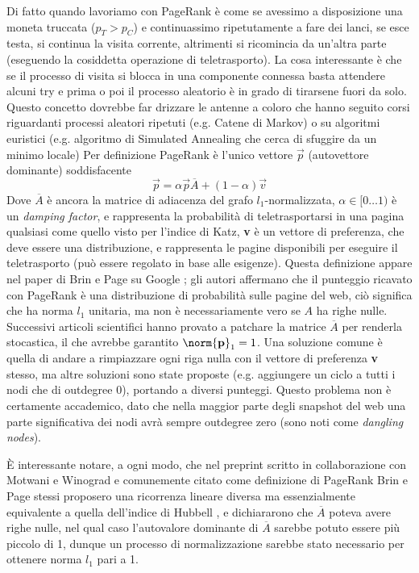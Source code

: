 Di fatto quando lavoriamo con PageRank è come se avessimo a disposizione una moneta truccata ($p_T >
	p_C$) e continuassimo ripetutamente a fare dei lanci, se esce testa, si continua la visita corrente,
altrimenti si ricomincia da un'altra parte (eseguendo la cosiddetta operazione di teletrasporto). La cosa interessante è che se il processo di visita si blocca in una componente connessa basta attendere alcuni try e prima o poi il processo aleatorio è in grado di tirarsene fuori da solo. Questo concetto dovrebbe far drizzare le antenne a coloro che hanno seguito corsi riguardanti processi aleatori ripetuti (e.g. Catene di Markov) o su algoritmi euristici (e.g. algoritmo di Simulated Annealing che cerca di sfuggire da un minimo locale)
Per definizione PageRank è l'unico vettore $\vec{p}$ (autovettore dominante) soddisfacente
\begin{equation}
	\label{eq:pagerank}
	\vec{p} = \alpha\vec{p}\overline{A} + (1 - \alpha)\vec{v}
\end{equation}
Dove $\overline{A}$ è ancora la matrice di adiacenza del grafo $l_1$-normalizzata, $\alpha \in [0\dots1)$ è un \textit{damping factor}, e rappresenta la probabilità di teletrasportarsi in una pagina qualsiasi come quello visto per l'indice di Katz, \textbf{v} è un vettore di preferenza, che deve essere una distribuzione, e rappresenta le pagine disponibili per eseguire il teletrasporto (può essere regolato in base alle esigenze). Questa definizione appare nel paper di Brin e Page su Google \cite{google}; gli autori affermano che il punteggio ricavato con PageRank è una distribuzione di probabilità sulle pagine del web, ciò significa che ha norma $l_1$ unitaria, ma non è necessariamente vero se $A$ ha righe nulle. Successivi articoli scientifici hanno provato a patchare la matrice $\overline{A}$ per renderla stocastica, il che avrebbe garantito $\norm{\textbf{p}}_1 = 1$. Una soluzione comune è quella di andare a rimpiazzare ogni riga nulla con il vettore di preferenza \textbf{v} stesso, ma altre soluzioni sono state proposte (e.g. aggiungere un ciclo a tutti i nodi che di outdegree 0), portando a diversi punteggi. Questo problema non è certamente accademico, dato che nella maggior parte degli snapshot del web una parte significativa dei nodi avrà sempre outdegree zero (sono noti come \textit{dangling nodes}).

È interessante notare, a ogni modo, che nel preprint scritto in collaborazione con Motwani e Winograd e comunemente citato come definizione di PageRank \cite{prankpreprint} Brin e Page stessi proposero una ricorrenza lineare diversa ma essenzialmente equivalente a quella dell'indice di Hubbell \cite{hub}, e dichiararono che $\overline{A}$ poteva avere righe nulle, nel qual caso l'autovalore dominante di $\overline{A}$ sarebbe potuto essere più piccolo di 1, dunque un processo di normalizzazione sarebbe stato necessario per ottenere norma $l_1$ pari a 1.

